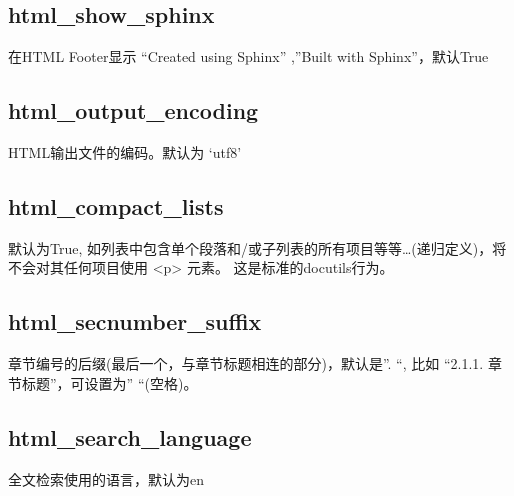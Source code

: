 \documentclass[a4paper,10pt,english]{sphinxmanual}
\begin{document}
\subsection{html\_show\_sphinx}
\label{\detokenize{sphinx_conf:html-show-sphinx}}
\sphinxAtStartPar
在HTML Footer显示 “Created using Sphinx” ,”Built with Sphinx”，默认True


\subsection{html\_output\_encoding}
\label{\detokenize{sphinx_conf:html-output-encoding}}
\sphinxAtStartPar
HTML输出文件的编码。默认为 ‘utf\sphinxhyphen{}8’


\subsection{html\_compact\_lists}
\label{\detokenize{sphinx_conf:html-compact-lists}}
\sphinxAtStartPar
默认为True, 如列表中包含单个段落和/或子列表的所有项目等等…(递归定义)，将不会对其任何项目使用 <p> 元素。
这是标准的docutils行为。


\subsection{html\_secnumber\_suffix}
\label{\detokenize{sphinx_conf:html-secnumber-suffix}}
\sphinxAtStartPar
章节编号的后缀(最后一个，与章节标题相连的部分)，默认是”. “, 比如 “2.1.1. 章节标题”，可设置为” “(空格)。


\subsection{html\_search\_language}
\label{\detokenize{sphinx_conf:html-search-language}}
\sphinxAtStartPar
全文检索使用的语言，默认为en
\end{document}

